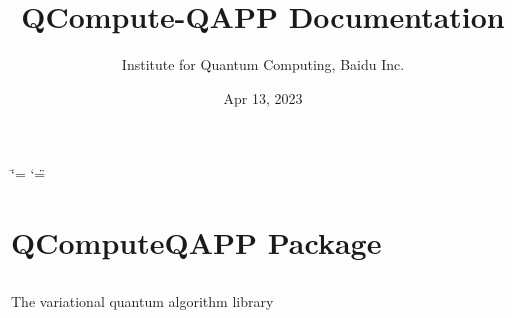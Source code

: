 \documentclass[letterpaper,10pt,english]{sphinxmanual}
\title{QCompute-QAPP Documentation}
\date{Apr 13, 2023}
\author{Institute for Quantum Computing, Baidu Inc.}
\begin{document}
\ifdefined\shorthandoff
  \ifnum\catcode`\=\string=\active\shorthandoff{=}\fi
  \ifnum\catcode`\"=\active{}\fi
\fi

\pagestyle{empty}
\sphinxmaketitle
\pagestyle{plain}
\sphinxtableofcontents
\pagestyle{normal}
\label{\detokenize{index::doc}}


\sphinxstepscope

\sphinxstepscope


\chapter{QCompute\sphinxhyphen{}QAPP Package}
\label{\detokenize{qcompute_qapp:qcompute-qapp-package}}\label{\detokenize{qcompute_qapp::doc}}\label{\detokenize{qcompute_qapp::doc}}
\sphinxstepscope


\section{}
\label{\detokenize{qcompute_qapp.algorithm:module-qcompute_qapp.algorithm}}\label{\detokenize{qcompute_qapp.algorithm:qcompute-qapp-algorithm}}\label{\detokenize{qcompute_qapp.algorithm::doc}}
\sphinxAtStartPar
The variational quantum algorithm library
\end{document}
